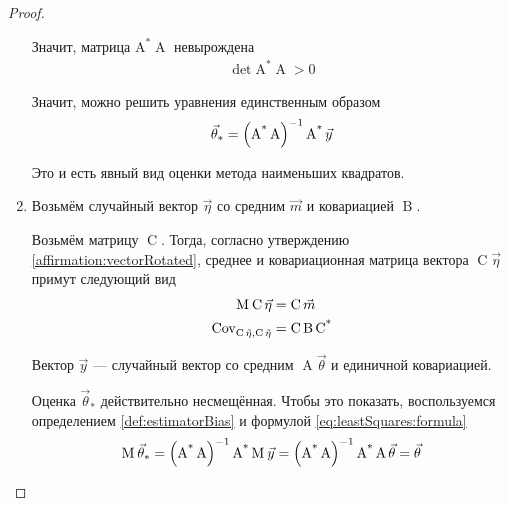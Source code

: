 \begin{proof}
\begin{enumerate}
            Значит, матрица $\operatorname{A^*} \operatorname{A}$ невырождена
            \begin{align*}
                \det{\operatorname{A^*} \operatorname{A}} > 0
            \end{align*}

            Значит, можно решить уравнения единственным образом
            \begin{equation}\label{eq:leastSquares:formula}
                \index{оценка!метода наименьших квадратов!формула}
                \vec{\theta}_*
                = \left( \operatorname{A^*} \operatorname{A} \right)^{-1}
                    \operatorname{A^*} \vec{y}
            \end{equation}

            Это и есть явный вид оценки метода наименьших квадратов.

        \item Возьмём случайный вектор $\vec{\eta}$ со средним $\vec{m}$
            и ковариацией $\operatorname{B}$.
            
            Возьмём матрицу $\operatorname{C}$. Тогда, согласно утверждению
            \ref{affirmation:vectorRotated}, среднее и ковариационная матрица
            вектора $\operatorname{C}\vec{\eta}$ примут следующий вид
            \begin{align*}
                \operatorname{M}_{} \operatorname{C}\vec{\eta}
                    &= \operatorname{C} \vec{m}\\
                \operatorname{Cov^{}_{\operatorname{C} \vec{\eta}, \operatorname{C} \vec{\eta}}}
                    &= \operatorname{C} \operatorname{B} \operatorname{C^*}
            \end{align*}

            Вектор $\vec{y}$ --- случайный вектор со средним
            $\operatorname{A} \vec{\theta}$ и единичной ковариацией.

            Оценка $\vec{\theta}_*$ действительно несмещённая. Чтобы это
            показать, воспользуемся определением \ref{def:estimatorBias}
            и формулой \ref{eq:leastSquares:formula}
            \begin{align*}
                \operatorname{M}_{} \vec{\theta}_*
                = \left( \operatorname{A^*} \operatorname{A} \right)^{-1}
                    \operatorname{A^*} \operatorname{M}_{} \vec{y}
                = \left( \operatorname{A^*} \operatorname{A} \right)^{-1}
                    \operatorname{A^*} \operatorname{A} \vec{\theta}
                = \vec{\theta}
            \end{align*}


\end{enumerate}
\end{proof}

